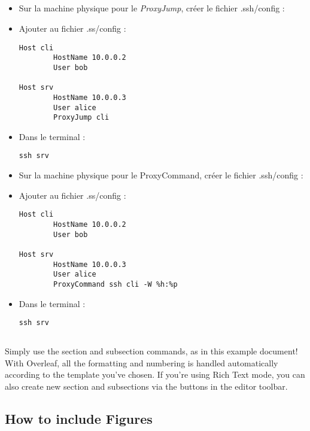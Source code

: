 \documentclass{article}
\begin{document}
\subsection{}

\begin{itemize}
\item Sur la machine physique pour le \emph{ProxyJump}, créer le fichier .ssh/config :
\item Ajouter au fichier .ss/config :
\begin{lstlisting}
Host cli
        HostName 10.0.0.2
        User bob

Host srv
        HostName 10.0.0.3
        User alice
        ProxyJump cli
\end{lstlisting}
\item Dans le terminal :
\begin{lstlisting}
ssh srv
\end{lstlisting}
\item Sur la machine physique pour le ProxyCommand, créer le fichier .ssh/config :
\item Ajouter au fichier .ss/config :
\begin{lstlisting}
Host cli
        HostName 10.0.0.2
        User bob

Host srv
        HostName 10.0.0.3
        User alice
        ProxyCommand ssh cli -W %h:%p
\end{lstlisting}
\item Dans le terminal :
\begin{lstlisting}
ssh srv
\end{lstlisting}
\end{itemize}

\subsection{}
\subsection{}

Simply use the section and subsection commands, as in this example document! With Overleaf, all the formatting and numbering is handled automatically according to the template you've chosen. If you're using Rich Text mode, you can also create new section and subsections via the buttons in the editor toolbar.

\subsection{How to include Figures}
\end{document}
